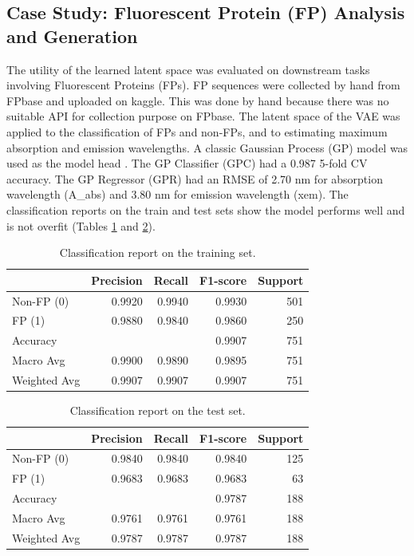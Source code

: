 \documentclass[unnumsec,webpdf,contemporary,medium]{oup-authoring-template}
\begin{document}
\subsection{Case Study: Fluorescent Protein (FP) Analysis and Generation}\label{sec:fp_application}
The utility of the learned latent space was evaluated on downstream tasks involving Fluorescent Proteins (FPs). FP sequences were collected by hand from FPbase \cite{lambert2022fpbase} and uploaded on kaggle. This was done by hand because there was no suitable API for collection purpose on FPbase. The latent space of the VAE was applied to the classification of FPs and non-FPs, and to estimating maximum absorption and emission wavelengths. A classic Gaussian Process (GP) model was used as the model head \cite{rasmussen2006gaussian}. The GP Classifier (GPC) had a 0.987 5-fold CV accuracy. The GP Regressor (GPR) had an RMSE of 2.70 nm for absorption wavelength (A\_abs) and 3.80 nm for emission wavelength (xem). The classification reports on the train and test sets show the model performs well and is not overfit (Tables \ref{tab:class_report_train} and \ref{tab:class_report_test}).

\begin{table}[!ht]
\centering
\caption{Classification report on the training set.}\label{tab:class_report_train}
\begin{tabular*}{0.5\textwidth}{@{\extracolsep{\fill}}lrrrr}
\toprule
& \textbf{Precision} & \textbf{Recall} & \textbf{F1-score} & \textbf{Support} \\
\midrule
Non-FP (0) & 0.9920 & 0.9940 & 0.9930 & 501 \\
FP (1) & 0.9880 & 0.9840 & 0.9860 & 250 \\
\midrule
Accuracy & & & 0.9907 & 751 \\
Macro Avg & 0.9900 & 0.9890 & 0.9895 & 751 \\
Weighted Avg & 0.9907 & 0.9907 & 0.9907 & 751 \\
\bottomrule
\end{tabular*}
\end{table}

\begin{table}[!ht]
\centering
\caption{Classification report on the test set.}\label{tab:class_report_test}
\begin{tabular*}{0.5\textwidth}{@{\extracolsep{\fill}}lrrrr}
\toprule
& \textbf{Precision} & \textbf{Recall} & \textbf{F1-score} & \textbf{Support} \\
\midrule
Non-FP (0) & 0.9840 & 0.9840 & 0.9840 & 125 \\
FP (1) & 0.9683 & 0.9683 & 0.9683 & 63 \\
\midrule
Accuracy & & & 0.9787 & 188 \\
Macro Avg & 0.9761 & 0.9761 & 0.9761 & 188 \\
Weighted Avg & 0.9787 & 0.9787 & 0.9787 & 188 \\
\bottomrule
\end{tabular*}
\end{table}
\end{document}
